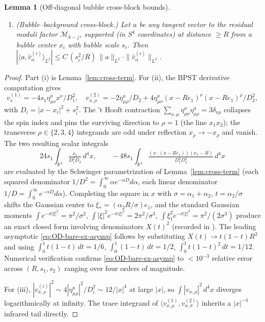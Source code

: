 \documentclass[11pt,letterpaper]{article}
\newtheorem{lemma}[theorem]{Lemma}
\theoremstyle{definition}
\newcommand{\bbR}{\mathbb{R}}
\newcommand{\cM}{\mathcal{M}}
\begin{document}
\begin{lemma}[Off-diagonal bubble cross-block bounds]
\begin{enumerate}
\item[(v)] \emph{(Bubble--background cross-block.)} Let $a$ be any tangent vector to the residual moduli factor $\cM_{k-j}$, supported (in $S^4$ coordinates) at distance $\ge R$ from a bubble center $x_i$ with bubble scale $s_i$. Then $|\langle a, \hat{v}_\alpha^{(i)}\rangle_{L^2}| \le C\,(s_i^2/R)\,\|a\|_{L^2}\cdot\|\hat{v}_\alpha^{(i)}\|_{L^2}$.
\end{enumerate}
\end{lemma}

\begin{proof}
Part (i) is Lemma~\ref{lem:cross-term}. For (ii), the BPST derivative computation gives
\[
v_s^{(1)} = -4s_1 \eta^a_{\mu\nu} x^\nu/D_1^2,\quad v_{x,\rho}^{(2)} = -2\eta^a_{\mu\rho}/D_2 + 4\eta^a_{\mu\nu}(x-Re_1)^\nu(x-Re_1)^\rho/D_2^2,
\]
with $D_i = |x-x_i|^2 + s_i^2$. The 't Hooft contraction $\sum_{a,\mu}\eta^a_{\mu\nu}\eta^a_{\mu\rho} = 3\delta_{\nu\rho}$ collapses the spin index and pins the surviving direction to $\rho=1$ (the line $x_1 x_2$); the transverse $\rho\in\{2,3,4\}$ integrands are odd under reflection $x_\rho \to -x_\rho$ and vanish. The two resulting scalar integrals
\[
24 s_1\!\int_{\bbR^4}\!\tfrac{x_1}{D_1^2 D_2}\,d^4x,\qquad -48 s_1\!\int_{\bbR^4}\!\tfrac{(x\cdot(x-Re_1))(x_1-R)}{D_1^2 D_2^2}\,d^4x
\]
are evaluated by the Schwinger parametrization of Lemma~\ref{lem:cross-term} (each squared denominator $1/D^2 = \int_0^\infty \alpha e^{-\alpha D}d\alpha$, each linear denominator $1/D = \int_0^\infty e^{-\alpha D}d\alpha$). Completing the square in $x$ with $\sigma = \alpha_1+\alpha_2$, $t = \alpha_2/\sigma$ shifts the Gaussian center to $\xi_* = (\alpha_2 R/\sigma)e_1$, and the standard Gaussian moments $\int e^{-\sigma|\xi|^2} = \pi^2/\sigma^2$, $\int |\xi|^2 e^{-\sigma|\xi|^2} = 2\pi^2/\sigma^3$, $\int \xi_1^2 e^{-\sigma|\xi|^2} = \pi^2/(2\sigma^3)$ produce an exact closed form involving denominators $X(t)^2$ (recorded in \cite{lemma-od-script}). The leading asymptotic \eqref{eq:OD-bare-sx-asymp} follows by substituting $X(t) \to t(1-t)R^2$ and using $\int_0^1 t(1-t)\,dt = 1/6$, $\int_0^1 (1-t)\,dt = 1/2$, $\int_0^1 t(1-t)^2\,dt = 1/12$. Numerical verification \cite{lemma-od-script} confirms \eqref{eq:OD-bare-sx-asymp} to $<10^{-3}$ relative error across $(R, s_1, s_2)$ ranging over four orders of magnitude.

For (iii), $|v_{x,\rho}^{(i)}|^2 \sim 4|\eta_{\mu\rho}^a|^2/D_i^2 \sim 12/|x|^4$ at large $|x|$, so $\int |v_{x,\rho}|^2\,d^4x$ diverges logarithmically at infinity. The trace integrand of $\langle v_{x,\rho}^{(1)}, v_{x,\sigma}^{(2)}\rangle$ inherits a $|x|^{-4}$ infrared tail directly.


\end{proof}
\end{document}
